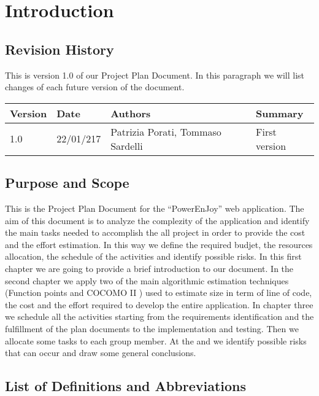 \section{Introduction}

\subsection{Revision History}

	This is version 1.0 of our Project Plan Document.
	In this paragraph we will list changes of each future version of the document.
	
	\begin{tabular}{|l|l|l|l|}
		\hline
		\textbf{Version}	& \textbf{Date}	& \textbf{Authors}	& \textbf{Summary}\\
		\hline
		1.0					& 22/01/217		& Patrizia Porati, Tommaso Sardelli	& First version\\
		\hline
	\end{tabular}

\subsection{Purpose and Scope}

	This is the Project Plan Document for the ``PowerEnJoy'' web application. The aim of this document is to analyze the complezity of the application and identify the main tasks needed to accomplish the all project in order to provide the cost and the effort estimation. In this way we define the required budjet, the resources allocation, the schedule of the activities and identify possible risks.
	In this first chapter we are going to provide a brief introduction to our document.
	In the second chapter we apply two of the main algorithmic estimation techniques (Function points and COCOMO  II ) used to estimate size in term of line of code, the cost and the effort required to develop the entire application. 
	In chapter three we schedule all the activities starting from the requirements identification and the fulfillment of the plan documents to the implementation and testing.
	Then we allocate some tasks to each group member.
	At the and we identify possible risks that can occur and draw some general conclusions.
	
	
\subsection{List of Definitions and Abbreviations}

